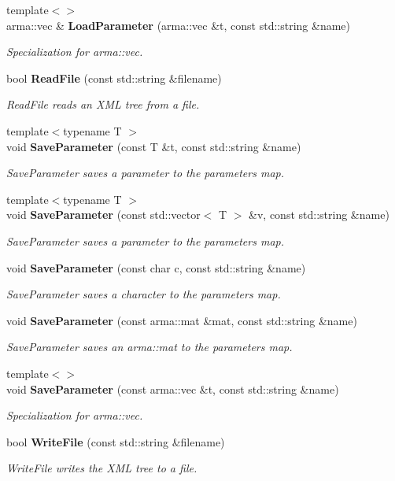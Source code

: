 \begin{DoxyCompactItemize}
{\footnotesize template$<$$>$ }\\arma\-::vec \& {\bf Load\-Parameter} (arma\-::vec \&t, const std\-::string \&name)
\begin{DoxyCompactList}\small\item\em Specialization for arma\-::vec. \end{DoxyCompactList}\item 
bool {\bf Read\-File} (const std\-::string \&filename)
\begin{DoxyCompactList}\small\item\em Read\-File reads an X\-M\-L tree from a file. \end{DoxyCompactList}\item 
{\footnotesize template$<$typename T $>$ }\\void {\bf Save\-Parameter} (const T \&t, const std\-::string \&name)
\begin{DoxyCompactList}\small\item\em Save\-Parameter saves a parameter to the parameters map. \end{DoxyCompactList}\item 
{\footnotesize template$<$typename T $>$ }\\void {\bf Save\-Parameter} (const std\-::vector$<$ T $>$ \&v, const std\-::string \&name)
\begin{DoxyCompactList}\small\item\em Save\-Parameter saves a parameter to the parameters map. \end{DoxyCompactList}\item 
void {\bf Save\-Parameter} (const char c, const std\-::string \&name)
\begin{DoxyCompactList}\small\item\em Save\-Parameter saves a character to the parameters map. \end{DoxyCompactList}\item 
void {\bf Save\-Parameter} (const arma\-::mat \&mat, const std\-::string \&name)
\begin{DoxyCompactList}\small\item\em Save\-Parameter saves an arma\-::mat to the parameters map. \end{DoxyCompactList}\item 
{\footnotesize template$<$$>$ }\\void {\bf Save\-Parameter} (const arma\-::vec \&t, const std\-::string \&name)
\begin{DoxyCompactList}\small\item\em Specialization for arma\-::vec. \end{DoxyCompactList}\item 
bool {\bf Write\-File} (const std\-::string \&filename)
\begin{DoxyCompactList}\small\item\em Write\-File writes the X\-M\-L tree to a file. \end{DoxyCompactList}\end{DoxyCompactItemize}
